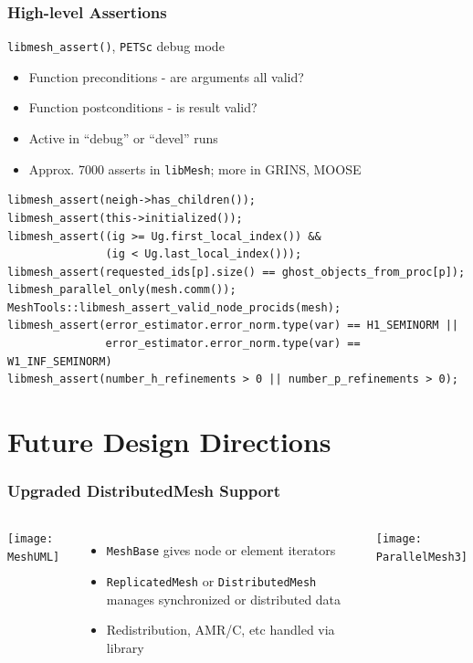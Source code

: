 \documentclass[mathserif]{beamer}
\newcommand{\software}[1]{{\texttt{#1}}}
\newcommand{\libMesh}{\software{libMesh}}
\newcommand{\PETSc}{\software{PETSc}}
\begin{document}
\begin{frame}[fragile]
\frametitle{High-level Assertions}
\begin{block}{{\texttt{libmesh\_assert()}, \PETSc} debug mode}
\begin{itemize}
\item Function preconditions - are arguments all valid?
\item Function postconditions - is result valid?
\item Active in ``debug'' or ``devel'' runs
\item Approx. 7000 asserts in \libMesh{}; more in GRINS, MOOSE
\end{itemize}
\end{block}

\pause

{\footnotesize
\begin{verbatim}
libmesh_assert(neigh->has_children());
libmesh_assert(this->initialized());
libmesh_assert((ig >= Ug.first_local_index()) &&
               (ig < Ug.last_local_index()));
libmesh_assert(requested_ids[p].size() == ghost_objects_from_proc[p]);
libmesh_parallel_only(mesh.comm());
MeshTools::libmesh_assert_valid_node_procids(mesh);
libmesh_assert(error_estimator.error_norm.type(var) == H1_SEMINORM ||
               error_estimator.error_norm.type(var) == W1_INF_SEMINORM)
libmesh_assert(number_h_refinements > 0 || number_p_refinements > 0);
\end{verbatim}
}
\end{frame}



\section{Future Design Directions}


\begin{frame}
\frametitle{Upgraded DistributedMesh Support}
\begin{columns}
\begin{center}
\texttt{[image: MeshUML]}
\end{center}
\begin{itemize}
\item \texttt{MeshBase} gives node or element iterators
\item \texttt{ReplicatedMesh} or \texttt{DistributedMesh} manages synchronized or distributed data
\item Redistribution, AMR/C, etc handled via library
\end{itemize}

\texttt{[image: ParallelMesh3]}
\end{columns}

\end{frame}
\end{document}
